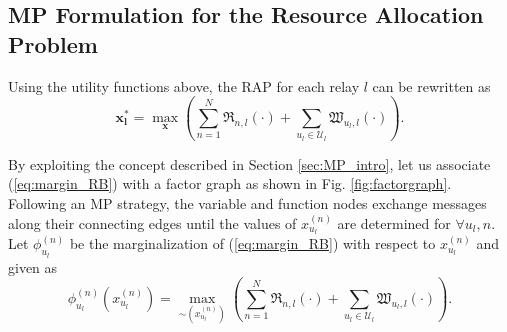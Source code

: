 \documentclass[twocolumn,10pt]{IEEEtran}
\begin{document}
\subsection{MP Formulation for the Resource Allocation Problem}

Using the utility functions above, the RAP for each relay $l$ can be rewritten as
\begin{equation} \label{eq:margin_RB}
\mathbf{x}_{\boldsymbol l}^* = \underset{\mathbf{x}}{\operatorname{max}} \left( \sum_{n=1}^{N} \mathfrak{R}_{n,l}(\cdot) + \sum_{u_l \in \mathcal{U}_l} \mathfrak{W}_{u_l, l}(\cdot) \right).
\end{equation}


By exploiting the concept  described in Section \ref{sec:MP_intro}, let us associate (\ref{eq:margin_RB}) with a factor graph as shown in Fig. \ref{fig:factorgraph}. Following an MP strategy, the variable and function nodes exchange messages along their connecting edges until the values of $x_{u_l}^{(n)}$  are determined for $\forall u_l, n$. Let $\phi_{u_l}^{(n)}$ be the marginalization of (\ref{eq:margin_RB}) with respect to $x_{u_l}^{(n)}$ and given as
\begin{equation}
\phi_{u_l}^{(n)}\left( x_{u_l}^{(n)} \right) = \underset{\sim \left(x_{u_l}^{(n)} \right)}{\operatorname{max}} \left( \sum_{n=1}^{N} \mathfrak{R}_{n,l}(\cdot) + \sum_{u_l \in \mathcal{U}_l} \mathfrak{W}_{u_l, l}(\cdot) \right).
\end{equation}
\end{document}
